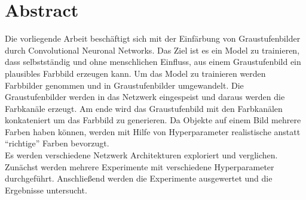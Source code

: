\chapter*{Abstract}
Die vorliegende Arbeit beschäftigt sich mit der Einfärbung von Graustufenbilder durch Convolutional Neuronal Networks.
Das Ziel ist es ein Model zu trainieren, dass selbstständig und ohne menschlichen Einfluss, aus einem Graustufenbild ein plausibles Farbbild erzeugen kann.
Um das Model zu trainieren werden Farbbilder genommen und in Graustufenbilder umgewandelt. Die Graustufenbilder werden in das Netzwerk eingespeist und daraus werden die
Farbkanäle erzeugt. Am ende wird das Graustufenbild mit den Farbkanälen konkateniert um das Farbbild zu generieren. Da Objekte auf einem Bild mehrere Farben haben können, werden mit Hilfe
von Hyperparameter realistische anstatt ``richtige'' Farben bevorzugt.
\\
Es werden verschiedene Netzwerk Architekturen exploriert und verglichen. Zunächst werden mehrere Experimente mit verschiedene Hyperparameter durchgeführt.
Anschließend werden die Experimente ausgewertet und die Ergebnisse untersucht.